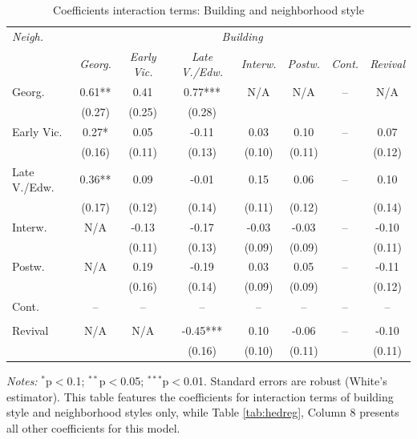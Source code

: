 \documentclass[]{article}
\begin{document}
\begin{table}[ht]
\centering
\caption{Coefficients interaction terms: Building and neighborhood style}
\label{tab:hedregint}
\begin{tabular}{lccccccc}
\toprule
\emph{Neigh.} & \multicolumn{7}{c}{\emph{Building}} \\
 \cmidrule(lr){1-1}
 \cmidrule(lr){2-8}
& \emph{Georg.} & \emph{Early Vic.} & \emph{Late V./Edw.} & \emph{Interw.} & \emph{Postw.} & \emph{Cont.} & \emph{Revival} \\ 
  \cmidrule(lr){2-8}

Georg. & 0.61** & 0.41 & 0.77*** & N/A & N/A & -- & N/A \\ 
 & (0.27) & (0.25) & (0.28) &  &  &  &  \\ 
Early Vic. & 0.27* & 0.05 & -0.11 & 0.03 & 0.10 & -- & 0.07 \\ 
    & (0.16) & (0.11) & (0.13) & (0.10) & (0.11) &  & (0.12) \\ 
Late V./Edw. & 0.36** & 0.09 & -0.01 & 0.15 & 0.06 & -- & 0.10 \\ 
 & (0.17) & (0.12) & (0.14) & (0.11) & (0.12) &  & (0.14) \\ 
Interw. & N/A & -0.13 & -0.17 & -0.03 & -0.03 & -- & -0.10 \\ 
 &  & (0.11) & (0.13) & (0.09) & (0.09) &  & (0.11) \\ 
Postw. & N/A & 0.19 & -0.19 & 0.03 & 0.05 & -- & -0.11 \\ 
 &  & (0.16) & (0.14) & (0.09) & (0.09) &  & (0.12) \\ 
Cont. & -- & -- & -- & -- & -- & -- & -- \\ 
 &  & &  &  &  & &  \\ 
Revival & N/A & N/A & -0.45*** & 0.10 & -0.06 & -- & -0.10 \\ 
 &  &  & (0.16) & (0.10) & (0.11) &  & (0.11) \\ 
\bottomrule
\end{tabular}
\begin{minipage}{\textwidth}
\vspace{0.25cm}
\footnotesize \emph{Notes:} $^{*}$p$<$0.1; $^{**}$p$<$0.05; $^{***}$p$<$0.01. Standard errors are robust (White's estimator). This table features the coefficients for interaction terms of building style and neighborhood styles only, while Table \ref{tab:hedreg}, Column 8 presents all other coefficients for this model.
\end{minipage}
\end{table}
\end{document}
